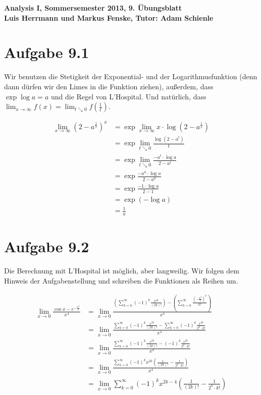 \documentclass[a4paper,german,12pt,smallheadings]{scrartcl}
\begin{document}
\begin{center}
\bfseries %
\sffamily %
\vspace{-40pt}
Analysis I, Sommersemester 2013, 9. Übungsblatt \\
Luis Herrmann und Markus Fenske, Tutor: Adam Schienle
\vspace{-10pt}
\end{center}

\section*{Aufgabe 9.1}

Wir benutzen die Stetigkeit der Exponential- und der Logarithmusfunktion (denn
dann dürfen wir den Limes in die Funktion ziehen), außerdem, dass $\exp \log a
= a$ und die Regel von L'Hospital. Und natürlich, dass $\lim_{x \to \infty}
f(x) = \lim_{t \searrow 0} f\left(\frac{1}{t}\right)$.

\begin{align*}
  \lim_{x \to \infty} \left(2-a^\frac{1}{x}\right)^x &= \exp \lim_{x \to \infty} x \cdot \log \left(2-a^\frac{1}{x}\right) \\
  &= \exp \lim_{t \searrow 0} \frac{\log (2-a^t)}{t} \\
  &= \exp \lim_{t \searrow 0} \frac{-a^t \cdot \log a}{2-a^t} \\
  &= \exp \frac{-a^0 \cdot \log a}{2-a^0} \\
  &= \exp \frac{-1 \cdot \log a}{2-1} \\
  &= \exp (-\log a) \\
  &= \frac{1}{a}
\end{align*}

\section*{Aufgabe 9.2}

Die Berechnung mit L'Hospital ist möglich, aber langweilig. Wir folgen dem
Hinweis der Aufgabenstellung und schreiben die Funktionen als Reihen um.

\begin{align*}
  \lim_{x \to 0} \frac{\cos x - e^{-\frac{x^2}{2}}}{x^4} &= \lim_{x \to 0} \frac{\left(\sum_{k=0}^\infty (-1)^k \frac{x^{2k}}{(2k)!}\right) - \left(\sum_{k=0}^{\infty} \frac{\left(-\frac{x^2}{2}\right)^k}{k!} \right)}{x^4} \\
   &= \lim_{x \to 0} \frac{\sum_{k=0}^\infty (-1)^k \frac{x^{2k}}{(2k)!} - \sum_{k=0}^{\infty} (-1)^k \frac{x^{2k}}{2^k \cdot k!}}{x^4} \\
   &= \lim_{x \to 0} \frac{\sum_{k=0}^\infty (-1)^k \frac{x^{2k}}{(2k)!} - (-1)^k \frac{x^{2k}}{2^k \cdot k!}}{x^4} \\
   &= \lim_{x \to 0} \frac{\sum_{k=0}^\infty (-1)^k x^{2k} \left(\frac{1}{(2k)!} - \frac{1}{2^k \cdot k!}\right)}{x^4} \\
   &= \lim_{x \to 0} \sum_{k=0}^\infty (-1)^k x^{2k-4} \left(\frac{1}{(2k)!} - \frac{1}{2^k \cdot k!}\right) \\
\end{align*}
\end{document}
